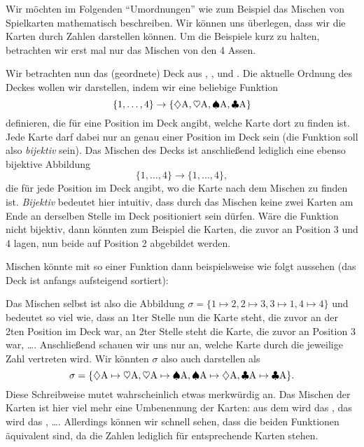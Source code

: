 \documentclass[../../main.tex]{subfiles}
\begin{document}
Wir möchten im Folgenden \enquote{Umordnungen} wie zum Beispiel das Mischen von Spielkarten mathematisch beschreiben. Wir können uns überlegen, dass wir die Karten durch Zahlen darstellen können. Um die Beispiele kurz zu halten, betrachten wir erst mal nur das Mischen von den 4 Assen.
\begin{example}\label{ex:perm_cards_01}
    Wir betrachten nun das (geordnete) Deck aus \AceDiamond{}, \AceHeart{}, \AceSpade{} und \AceClub. Die aktuelle Ordnung des Deckes wollen wir darstellen, indem wir eine beliebige Funktion $$\{1,\dots, 4\} \to \{\diamondsuit\text{A},\heartsuit\text{A},\spadesuit\text{A},\clubsuit\text{A}\}$$ definieren, die für eine Position im Deck angibt, welche Karte dort zu finden ist. Jede Karte darf dabei nur an genau einer Position im Deck sein (die Funktion soll also \emph{bijektiv} sein). Das Mischen des Decks ist anschließend lediglich eine ebenso bijektive Abbildung $$\{1,\dots, 4\} \to \{1,\dots,4\},$$ die für jede Position im Deck angibt, wo die Karte nach dem Mischen zu finden ist. \emph{Bijektiv} bedeutet hier intuitiv, dass durch das Mischen keine zwei Karten am Ende an derselben Stelle im Deck positioniert sein dürfen. Wäre die Funktion nicht bijektiv, dann könnten zum Beispiel die Karten, die zuvor an Position 3 und 4 lagen, nun beide auf Position 2 abgebildet werden. 
    
    Mischen könnte mit so einer Funktion dann beispielsweise wie folgt aussehen (das Deck ist anfangs aufsteigend sortiert):
    \begin{center}
    \end{center}
    Das Mischen selbst ist also die Abbildung $\sigma = \{1\mapsto 2, 2\mapsto 3, 3\mapsto 1, 4\mapsto 4\}$ und bedeutet so viel wie, dass an 1ter Stelle nun die Karte steht, die zuvor an der 2ten Position im Deck war, an 2ter Stelle steht die Karte, die zuvor an Position 3 war, \dots. Anschließend schauen wir uns nur an, welche Karte durch die jeweilige Zahl vertreten wird. Wir könnten $\sigma$ also auch darstellen als
    $$\sigma = \{\diamondsuit\text{A}\mapsto \heartsuit\text{A}, \heartsuit\text{A}\mapsto \spadesuit\text{A}, \spadesuit\text{A}\mapsto \diamondsuit\text{A}, \clubsuit\text{A}\mapsto \clubsuit\text{A}\}.$$
    Diese Schreibweise mutet wahrscheinlich etwas merkwürdig an. Das Mischen der Karten ist hier viel mehr eine Umbenennung der Karten: aus dem \AceDiamond{} wird das \AceHeart, das \AceHeart{} wird das \AceSpade, \dots. Allerdings können wir schnell sehen, dass die beiden Funktionen äquivalent sind, da die Zahlen lediglich für entsprechende Karten stehen.
\end{example}
\end{document}
